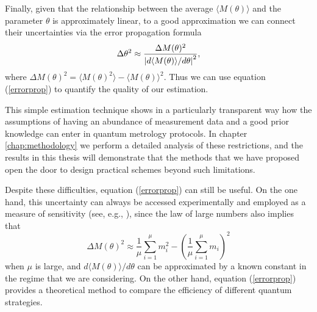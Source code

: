 Finally, given that the relationship between the average $\langle M(\theta)\rangle$ and the parameter $\theta$ is approximately linear, to a good approximation we can connect their uncertainties via the error propagation formula \citep{yurke1986, rafal2015, HofmannHolger2009}
\begin{equation}
\Delta \theta^2 \approx \frac{\Delta M(\theta)^2}{\abs{d\langle M(\theta) \rangle/d\theta}^2},
\label{errorprop}
\end{equation}
where $\Delta M(\theta)^2 = \langle  M(\theta)^2 \rangle - \langle M(\theta)  \rangle^2$. Thus we can use equation (\ref{errorprop}) to quantify the quality of our estimation. 

This simple estimation technique shows in a particularly transparent way how the assumptions of having an abundance of measurement data and a good prior knowledge can enter in quantum metrology protocols. In chapter \ref{chap:methodology} we perform a detailed analysis of these restrictions, and the results in this thesis will demonstrate that the methods that we have proposed open the door to design practical schemes beyond such limitations. 

Despite these difficulties, equation (\ref{errorprop}) can still be useful. On the one hand, this uncertainty can always be accessed experimentally and employed as a measure of sensitivity (see, e.g., \cite{baumgart2016}), since the law of large numbers also implies that
\begin{equation}
\Delta M(\theta)^2 \approx \frac{1}{\mu}\sum_{i=1}^\mu m_i^2 - \left(\frac{1}{\mu}\sum_{i=1}^\mu m_i \right)^2
\end{equation} 
when $\mu$ is large, and $d\langle M(\theta) \rangle/d\theta$ can be approximated by a known constant in the regime that we are considering. On the other hand, equation (\ref{errorprop}) provides a theoretical method to compare the efficiency of different quantum strategies. 


